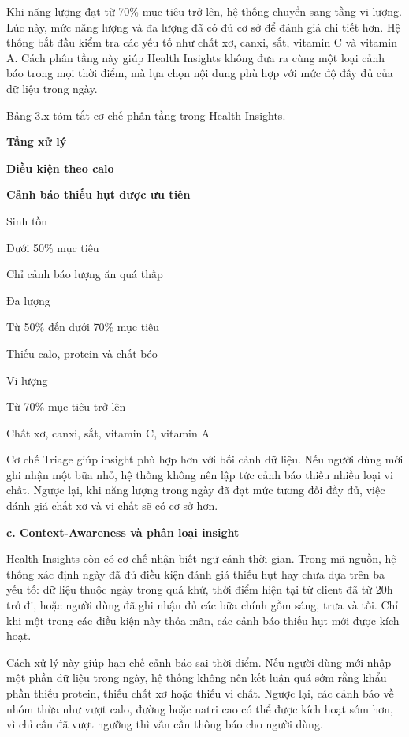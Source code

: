 \documentclass[12pt, a4paper]{report}
\begin{document}
Khi năng lượng đạt từ 70\% mục tiêu trở lên, hệ thống chuyển sang tầng vi lượng. Lúc này, mức năng lượng và đa lượng đã có đủ cơ sở để đánh giá chi tiết hơn. Hệ thống bắt đầu kiểm tra các yếu tố như chất xơ, canxi, sắt, vitamin C và vitamin A. Cách phân tầng này giúp Health Insights không đưa ra cùng một loại cảnh báo trong mọi thời điểm, mà lựa chọn nội dung phù hợp với mức độ đầy đủ của dữ liệu trong ngày.

Bảng 3.x tóm tắt cơ chế phân tầng trong Health Insights.

\textbf{Tầng xử lý}

\textbf{Điều kiện theo calo}

\textbf{Cảnh báo thiếu hụt được ưu tiên}

Sinh tồn

Dưới 50\% mục tiêu

Chỉ cảnh báo lượng ăn quá thấp

Đa lượng

Từ 50\% đến dưới 70\% mục tiêu

Thiếu calo, protein và chất béo

Vi lượng

Từ 70\% mục tiêu trở lên

Chất xơ, canxi, sắt, vitamin C, vitamin A

Cơ chế Triage giúp insight phù hợp hơn với bối cảnh dữ liệu. Nếu người dùng mới ghi nhận một bữa nhỏ, hệ thống không nên lập tức cảnh báo thiếu nhiều loại vi chất. Ngược lại, khi năng lượng trong ngày đã đạt mức tương đối đầy đủ, việc đánh giá chất xơ và vi chất sẽ có cơ sở hơn.

\textbf{c. Context-Awareness và phân loại insight}

Health Insights còn có cơ chế nhận biết ngữ cảnh thời gian. Trong mã nguồn, hệ thống xác định ngày đã đủ điều kiện đánh giá thiếu hụt hay chưa dựa trên ba yếu tố: dữ liệu thuộc ngày trong quá khứ, thời điểm hiện tại từ client đã từ 20h trở đi, hoặc người dùng đã ghi nhận đủ các bữa chính gồm sáng, trưa và tối. Chỉ khi một trong các điều kiện này thỏa mãn, các cảnh báo thiếu hụt mới được kích hoạt.

Cách xử lý này giúp hạn chế cảnh báo sai thời điểm. Nếu người dùng mới nhập một phần dữ liệu trong ngày, hệ thống không nên kết luận quá sớm rằng khẩu phần thiếu protein, thiếu chất xơ hoặc thiếu vi chất. Ngược lại, các cảnh báo về nhóm thừa như vượt calo, đường hoặc natri cao có thể được kích hoạt sớm hơn, vì chỉ cần đã vượt ngưỡng thì vẫn cần thông báo cho người dùng.
\end{document}
